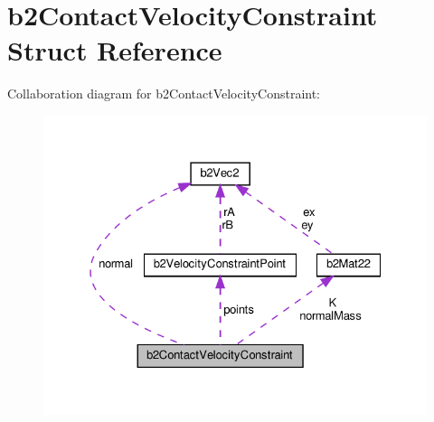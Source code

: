 \hypertarget{structb2ContactVelocityConstraint}{}\section{b2\+Contact\+Velocity\+Constraint Struct Reference}
\label{structb2ContactVelocityConstraint}


Collaboration diagram for b2\+Contact\+Velocity\+Constraint\+:
\nopagebreak
\begin{figure}[H]
\begin{center}
\leavevmode
\includegraphics[width=328pt]{structb2ContactVelocityConstraint__coll__graph}
\end{center}
\end{figure}

